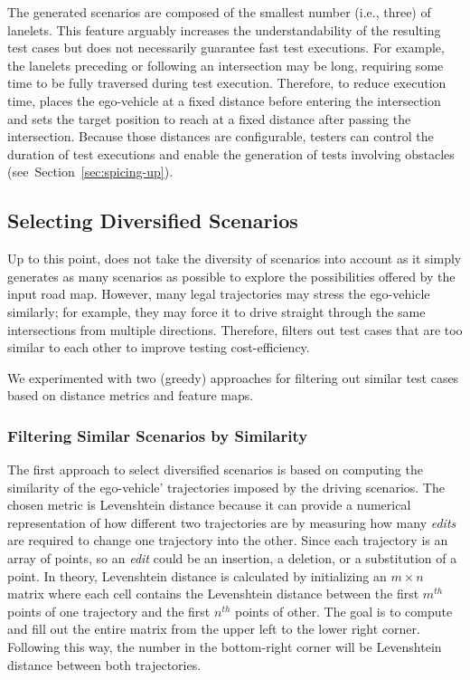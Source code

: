 \documentclass[conference]{IEEEtran}
\begin{document}
The generated scenarios are composed of the smallest number (i.e., three) of lanelets. This feature arguably increases the understandability of the resulting test cases but does not necessarily guarantee fast test executions. For example, the lanelets preceding or following an intersection may be long, requiring some time to be fully traversed during test execution. Therefore, to reduce execution time, \tool places the ego-vehicle at a fixed distance before entering the intersection and sets the target position to reach at a fixed distance after passing the intersection. Because those distances are configurable, testers can control the duration of test executions and enable the generation of tests involving obstacles (see~Section~\ref{sec:spicing-up}).


\subsection{Selecting Diversified Scenarios}
Up to this point, \tool does not take the diversity of scenarios into account as it simply generates as many scenarios as possible to explore the possibilities offered by the input road map. However, many legal trajectories may stress the ego-vehicle similarly; for example, they may force it to drive straight through the same intersections from multiple directions. Therefore, \tool filters out test cases that are too similar to each other to improve testing cost-efficiency.

We experimented with two (greedy) approaches for filtering out similar test cases based on distance metrics and feature maps.

\subsubsection{Filtering Similar Scenarios by Similarity}
The first approach to select diversified scenarios is based on computing the similarity of the ego-vehicle' trajectories imposed by the driving scenarios. The chosen metric is Levenshtein distance because it can provide a numerical representation of how different two trajectories are by measuring how many \emph{edits} are required to change one trajectory into the other. Since each trajectory is an array of points, so an \emph{edit} could be an insertion, a deletion, or a substitution of a point. In theory, Levenshtein distance is calculated by initializing an  $m\times n$ matrix where each cell contains the Levenshtein distance between the first $m^{th}$ points of one trajectory and the first $n^{th}$ points of other. The goal is to compute and fill out the entire matrix from the upper left to the lower right corner. Following this way, the number in the bottom-right corner will be Levenshtein distance between both trajectories.
%
\end{document}
